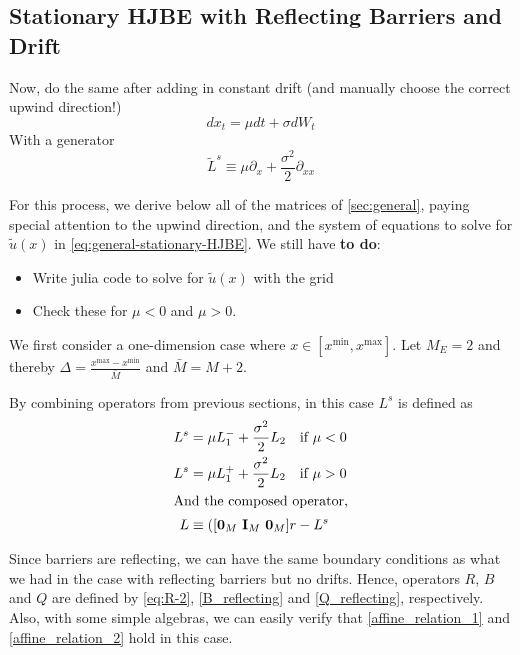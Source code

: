 \documentclass[11pt]{article}
\newcommand{\D}[1][]{\ensuremath{\partial_{#1}}}
\begin{document}
\subsection{Stationary HJBE with Reflecting Barriers and Drift}
Now, do the same after adding in constant drift (and manually choose the correct upwind direction!)
$$
d x_t = \mu dt + \sigma d W_t
$$
With a generator
$$
	\tilde{L}^s \equiv \mu \D[x] + \frac{\sigma^2}{2}\D[xx]
$$

For this process, we derive below all of the matrices of \cref{sec:general}, paying special attention to the upwind direction, and the system of equations to solve for $\tilde{u}(x)$ in \cref{eq:general-stationary-HJBE}. We still have \textbf{to do}:
\begin{itemize}
	\item Write julia code to solve for $\tilde{u}(x)$ with the grid
	\item Check these for $\mu < 0$ and $\mu > 0$.
\end{itemize}

We first consider a one-dimension case where $x\in [x^{\min},x^{\max}]$. Let $M_E = 2$ and thereby $\Delta  = \frac{x^{\max}-x^{\min}}{\bar{M}}$ and $\bar{M} = M+2$.

By combining operators from previous sections, in this case $L^s$ is defined as
\begin{align}
L^s &= \mu L_1^{-} +\frac{\sigma^2}{2}L_2\quad\text{if }\mu<0\\
L^s &=\mu L_1^{+} +\frac{\sigma^2}{2}L_2\quad\text{if }\mu>0\\
\intertext{And the composed operator,}
	L &\equiv ([\mathbf{0}_{M} \text{ } \mathbf{I}_{M} \text{ } \mathbf{0}_{M}] r -  L^s
\end{align}

Since barriers are reflecting, we can have the same boundary conditions as what we had in the case with reflecting barriers but no drifts. Hence, operators $R$, $B$ and $Q$ are defined by \cref{eq:R-2}, \cref{B_reflecting} and \cref{Q_reflecting}, respectively. Also, with some simple algebras, we can easily verify that \cref{affine_relation_1} and \cref{affine_relation_2} hold in this case.


\end{document}
